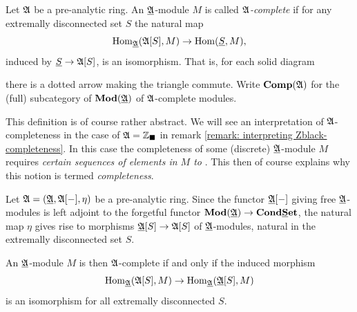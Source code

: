 \begin{definition}
	\label{definition: completeness}
	
	Let ${\mathfrak{A}}$ be a pre-analytic ring. An ${\underline{{\mathfrak{A}}}}$-module $M$ is called \emph{${\mathfrak{A}}$-complete} if for any extremally disconnected set $S$ the natural map
		$${\operatorname{Hom}}_{{\underline{{\mathfrak{A}}}}}({{{\mathfrak{A}}[S]}}, M) \to {\operatorname{Hom}}(\underline{S}, M),$$
	induced by $\underline{S}\to {{{\mathfrak{A}}[S]}}$, is an isomorphism. That is, for each solid diagram
	\begin{center}
	\end{center}
	there is a dotted arrow making the triangle commute. Write ${{\mathbf{Comp}}({\mathfrak{A}})}$ for the (full) subcategory of ${{\mathbf{Mod}}({\underline{{\mathfrak{A}}}})}$ of ${\mathfrak{A}}$-complete modules.
\end{definition}

\begin{remark}
	This definition is of course rather abstract. We will see an interpretation of ${\mathfrak{A}}$-completeness in the case of ${\mathfrak{A}} = {\mathbb{Z}}_\blacksquare$ in remark \ref{remark: interpreting Zblack-completeness}. In this case the completeness of some (discrete) ${\underline{{\mathfrak{A}}}}$-module $M$ requires \emph{certain sequences of elements in $M$ to }. This then of course explains why this notion is termed \emph{completeness}.
\end{remark}

\begin{remark}
	Let ${\mathfrak{A}}=({\underline{{\mathfrak{A}}}}, {{{\mathfrak{A}}[-]}}, \eta)$ be a pre-analytic ring. Since the functor ${{{\underline{{\mathfrak{A}}}}[-]}}$ giving free ${\underline{{\mathfrak{A}}}}$-modules is left adjoint to the forgetful functor ${{\mathbf{Mod}}({\underline{{\mathfrak{A}}}})} \to {{{\mathbf{Cond}}}{{\mathbf{\underline{S}et}}}}$, the natural map $\eta$ gives rise to morphisms ${{{\underline{{\mathfrak{A}}}}[S]}}\to {{{\mathfrak{A}}[S]}}$ of ${\underline{{\mathfrak{A}}}}$-modules, natural in the extremally disconnected set $S$.
	
	An ${\underline{{\mathfrak{A}}}}$-module $M$ is then ${\mathfrak{A}}$-complete if and only if the induced morphism
		$${\operatorname{Hom}}_{\underline{{\mathfrak{A}}}}({{{\mathfrak{A}}[S]}}, M) \to {\operatorname{Hom}}_{\underline{{\mathfrak{A}}}}({{{\underline{{\mathfrak{A}}}}[S]}}, M)$$
	is an isomorphism for all extremally disconnected $S$.
\end{remark}

